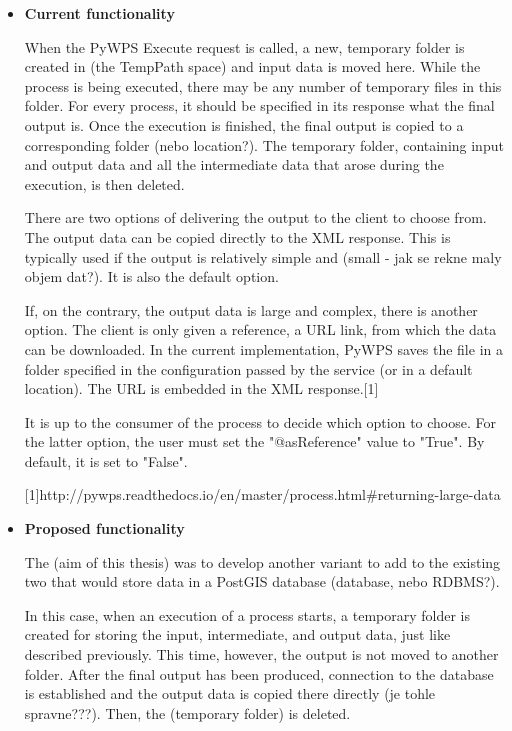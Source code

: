 \begin{itemize}

\item \textbf{Current functionality}

When the PyWPS Execute request is called, a new, temporary folder is created in (the TempPath space) and input data is moved here. While the process is being executed, there may be any number of temporary files in this folder. For every process, it should be specified in its response what the final output is. Once the execution is finished, the final output is copied to a corresponding folder (nebo location?). The temporary folder, containing input and output data and all the intermediate data that arose during the execution, is then deleted.

There are two options of delivering the output to the client to choose from. The output data can be copied directly to the  XML response. This is typically used if the output is relatively simple and (small - jak se rekne maly objem dat?). It is also the default option.

If, on the contrary, the output data is large and complex, there is another option. The client is only given a reference, a URL link, from which the data can be downloaded. In the current implementation, PyWPS saves the file in a folder specified in the configuration passed by the service (or in a default location). The URL is embedded in the XML response.[1]

It is up to the consumer of the process to decide which option to choose. For the latter option, the user must set the "@asReference" value to "True". By default, it is set to "False".

[1]http://pywps.readthedocs.io/en/master/process.html\#returning-large-data




\item \textbf{Proposed functionality}

The (aim of this thesis) was to develop another variant to add to the existing two that would store data in a PostGIS database (database, nebo RDBMS?). 

In this case, when an execution of a process starts, a temporary folder is created for storing the input, intermediate, and output data, just like described previously. This time, however, the output is not moved to another folder. After the final output has been produced, connection to the database is established and the output data is copied there directly (je tohle spravne???). Then, the (temporary folder) is deleted. 


\end{itemize}
